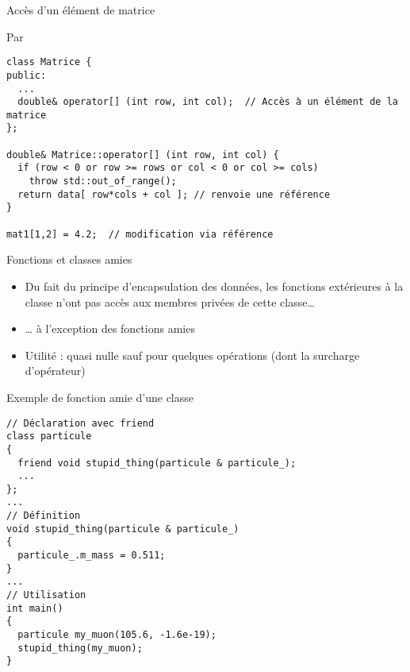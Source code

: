 \documentclass[c]{beamer}
\begin{document}
\begin{frame}[fragile]{Accès d'un élément de matrice}

Par
\begin{verbatim}
class Matrice {
public:
  ...
  double& operator[] (int row, int col);  // Accès à un élément de la matrice
};

double& Matrice::operator[] (int row, int col) {
  if (row < 0 or row >= rows or col < 0 or col >= cols)
    throw std::out_of_range();
  return data[ row*cols + col ]; // renvoie une référence
}

mat1[1,2] = 4.2;  // modification via référence
\end{verbatim}

\end{frame}


\begin{frame}[plain,label={sec:orgheadline12}]{}
\partpage
\end{frame}

\begin{frame}[label={sec:orgheadline13}]{Fonctions et classes amies}
\begin{itemize}
\item Du fait du principe d'encapsulation des données, les fonctions extérieures à
la classe n'ont pas accès aux membres privées de cette classe\ldots{}

\item \ldots{} à l'exception des fonctions amies

\item Utilité : quasi nulle sauf pour quelques opérations (dont la surcharge
d'opérateur)
\end{itemize}
\end{frame}

\begin{frame}[fragile,label={sec:orgheadline14}]{Exemple de fonction amie d'une classe}
 \begin{verbatim}
// Déclaration avec friend
class particule
{
  friend void stupid_thing(particule & particule_);
  ...
};
...
// Définition
void stupid_thing(particule & particule_)
{
  particule_.m_mass = 0.511;
}
...
// Utilisation
int main()
{
  particule my_muon(105.6, -1.6e-19);
  stupid_thing(my_muon);
}
\end{verbatim}
\end{frame}
\end{document}
